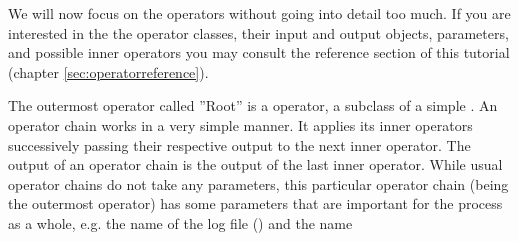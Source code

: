 We will now focus on the operators without going into detail too
much. If you are interested in the the operator classes, their input
and output objects, parameters, and possible inner operators you may
consult the reference section of this tutorial 
(chapter \ref{sec:operatorreference}). 

The outermost operator called ''Root'' is a
 operator, a subclass of a simple . An
operator chain works in a very simple manner. It applies its inner
operators successively passing their respective output to the next
inner operator. The output of an operator chain is the output of the
last inner operator. While usual operator chains do not take any
parameters, this  particular operator chain (being the outermost
operator) has some parameters that are important for the process as
a whole, e.g. the name of the log file () and the name
